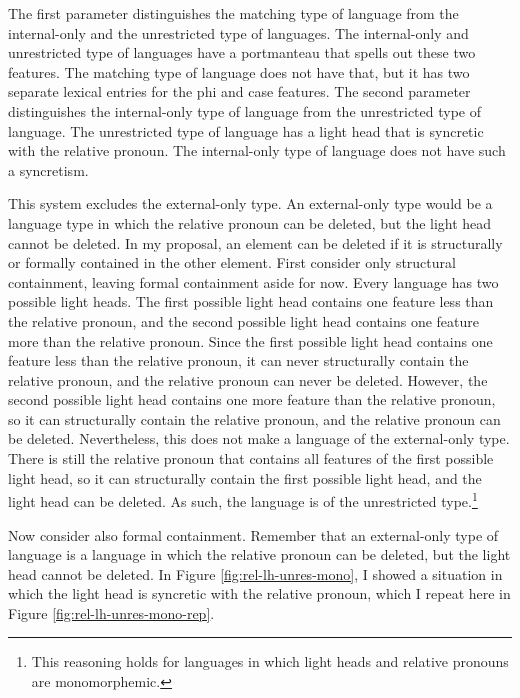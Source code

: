 The first parameter distinguishes the matching type of language from the internal-only and the unrestricted type of languages. The internal-only and unrestricted type of languages have a portmanteau that spells out these two features. The matching type of language does not have that, but it has two separate lexical entries for the phi and case features.
The second parameter distinguishes the internal-only type of language from the unrestricted type of language. The unrestricted type of language has a light head that is syncretic with the relative pronoun. The internal-only type of language does not have such a syncretism.

This system excludes the external-only type.
An external-only type would be a language type in which the relative pronoun can be deleted, but the light head cannot be deleted.
In my proposal, an element can be deleted if it is structurally or formally contained in the other element.
First consider only structural containment, leaving formal containment aside for now.
Every language has two possible light heads. The first possible light head contains one feature less than the relative pronoun, and the second possible light head contains one feature more than the relative pronoun.
Since the first possible light head contains one feature less than the relative pronoun, it can never structurally contain the relative pronoun, and the relative pronoun can never be deleted.
However, the second possible light head contains one more feature than the relative pronoun, so it can structurally contain the relative pronoun, and the relative pronoun can be deleted.
Nevertheless, this does not make a language of the external-only type. There is still the relative pronoun that contains all features of the first possible light head, so it can structurally contain the first possible light head, and the light head can be deleted. As such, the language is of the unrestricted type.\footnote{
This reasoning holds for languages in which light heads and relative pronouns are monomorphemic.
}

Now consider also formal containment.
Remember that an external-only type of language is a language in which the relative pronoun can be deleted, but the light head cannot be deleted.
In Figure \ref{fig:rel-lh-unres-mono}, I showed a situation in which the light head is syncretic with the relative pronoun, which I repeat here in Figure \ref{fig:rel-lh-unres-mono-rep}.

